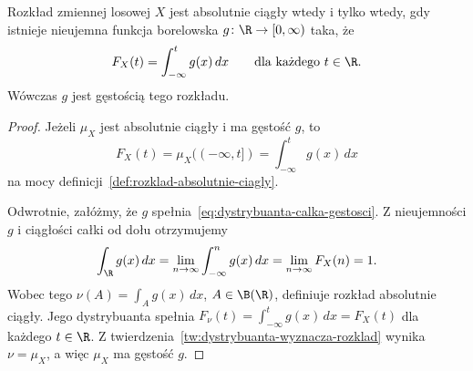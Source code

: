 \begin{fakt}
\label{fakt:dystrybuanta-z-gestosci}
Rozkład zmiennej losowej $X$ jest absolutnie ciągły wtedy i tylko wtedy,
gdy istnieje nieujemna funkcja borelowska $g\colon\R\to[0,\infty)$
taka, że
\begin{equation}
  F_X(t)=\int_{-\infty}^t g(x)\,dx
  \qquad\text{dla każdego }t\in\R.
  \label{eq:dystrybuanta-calka-gestosci}
\end{equation}
Wówczas $g$ jest gęstością tego rozkładu.
\end{fakt}

\begin{proof}
Jeżeli $\mu_X$ jest absolutnie ciągły i ma gęstość $g$, to
\[
  F_X(t)=\mu_X((-\infty,t])=\int_{-\infty}^{t}g(x)\,dx
\]
na mocy definicji~\ref{def:rozklad-absolutnie-ciagly}.

Odwrotnie, załóżmy, że $g$ spełnia~\eqref{eq:dystrybuanta-calka-gestosci}.
Z nieujemności $g$ i ciągłości całki od dołu otrzymujemy
\[
  \int_{\R}g(x)\,dx
    =\lim_{n\to\infty}\int_{-\infty}^n g(x)\,dx
    =\lim_{n\to\infty}F_X(n)=1.
\]
Wobec tego $\nu(A)=\int_A g(x)\,dx$, $A\in\B(\R)$,
definiuje rozkład absolutnie ciągły. Jego dystrybuanta spełnia
$F_\nu(t)=\int_{-\infty}^t g(x)\,dx=F_X(t)$ dla każdego $t\in\R$.
Z twierdzenia~\ref{tw:dystrybuanta-wyznacza-rozklad} wynika $\nu=\mu_X$,
a więc $\mu_X$ ma gęstość $g$.
\end{proof}
